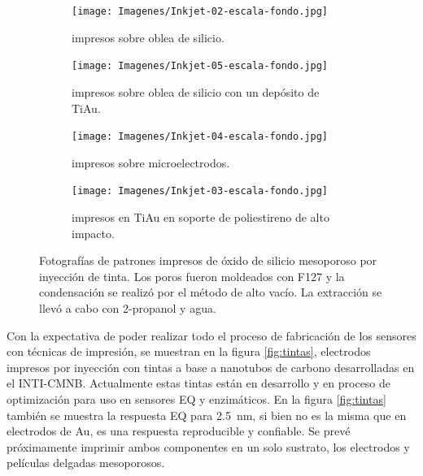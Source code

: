 { 		%
 	  		\begin{figure}[th]
			 	   	    \centering
			 	   	    \begin{subfigure}[t]{0.495\textwidth}
			        	\texttt{[image: Imagenes/Inkjet-02-escala-fondo.jpg]}
			        	\caption{\pdmF\space impresos sobre oblea de silicio.}
			       		\end{subfigure}
			     		\centering
			     		\begin{subfigure}[t]{0.495\textwidth}
			     		\texttt{[image: Imagenes/Inkjet-05-escala-fondo.jpg]}
			    		\caption{\pdmF\space impresos sobre oblea de silicio con un depósito de Ti\textbar Au.}
			    		\end{subfigure}
			    		\centering
			    		\begin{subfigure}[t]{0.495\textwidth}
			         	\texttt{[image: Imagenes/Inkjet-04-escala-fondo.jpg]}
			        	\caption{\pdmF\space impresos sobre microelectrodos.}
			        	\end{subfigure}
			        	\centering
			        	\begin{subfigure}[t]{0.495\textwidth}
			     		\texttt{[image: Imagenes/Inkjet-03-escala-fondo.jpg]}
 			        	\caption{\pdmF\space impresos en Ti\textbar	Au en soporte de poliestireno de alto impacto.}
			        	\end{subfigure}
			     		\caption[Electrodos impresos]{Fotografías de patrones impresos de óxido de silicio mesoporoso por inyección de tinta. Los poros fueron moldeados con F127 y la condensación se realizó por el método de alto vacío. La extracción se llevó a cabo con 2-propanol y agua.}
			     		\label{fig:flexibles}
			     	   	\end{figure}
			     	  
 	  Con la expectativa de poder realizar todo el proceso de fabricación de los sensores con técnicas de impresión, se muestran en la figura \ref{fig:tintas}, electrodos impresos por inyección con tintas a base a nanotubos de carbono desarrolladas en el INTI-CMNB. Actualmente estas tintas están en desarrollo y en proceso de optimización para uso en sensores EQ y enzimáticos\cite{longinotti2010,Mass2016}. En la figura \ref{fig:tintas} también se muestra la respuesta EQ para \fe\space \SI{2.5}{\nm}, si bien no es la misma que en electrodos de Au, es una respuesta reproducible y confiable. Se prevé próximamente imprimir ambos componentes en un solo sustrato, los electrodos y películas delgadas mesoporosos.

}
